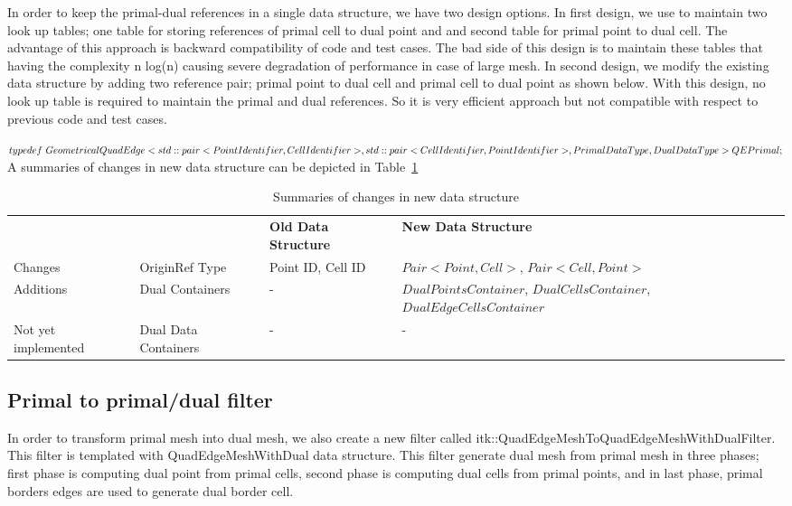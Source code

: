 \documentclass{InsightArticle}
\begin{document}
In order to keep the primal-dual references in a single data structure, we have two design options. In first design, we use to maintain two look up tables; one table for storing references of primal cell to dual point and and second table for primal point to dual cell. The advantage of this approach is backward compatibility of code and test cases. The bad side of this design is to maintain these tables that having the complexity n log(n) causing severe degradation of performance in case of large mesh. In second design, we modify the existing data structure by adding two reference pair; primal point to dual cell and primal cell to dual point as shown below. With this design, no look up table is required to maintain the primal and dual references. So it is very efficient approach but not compatible with respect to previous code and test cases. 

$typedef \ GeometricalQuadEdge< \\
    std::pair<PointIdentifier, CellIdentifier>, \\
    std::pair<CellIdentifier,  PointIdentifier>, \\
    PrimalDataType, DualDataType \\
    > QEPrimal;$
A summaries of changes in new data structure can be depicted in Table~\ref{table:secondDesign}
\begin{table}
	\begin{center}
		\caption{Summaries of changes in new data structure}
		\label{table:secondDesign}
		\begin{tabular}{ p{3.5cm} p{3.5cm} p{2cm} p{3.7cm} }
			\hline	
			\noalign{\smallskip} 
			{\bf  }	& {\bf } 	& {\bf Old Data Structure}	& {\bf New Data Structure}\\
			\noalign{\smallskip}	
			\hline  	
			\noalign{\smallskip}
			Changes & OriginRef Type & Point ID, Cell ID & $Pair<Point, Cell>$, $Pair<Cell, Point>$\\ 
			Additions & Dual Containers & - & $DualPointsContainer$, $DualCellsContainer$, $DualEdgeCellsContainer$\\
			Not yet implemented & Dual Data Containers & - & -\\
			\hline
	\end{tabular}
	\end{center}
\end{table}
\subsection{Primal to primal/dual filter }
In order to transform primal mesh into dual mesh, we also create a new filter called itk::QuadEdgeMeshToQuadEdgeMeshWithDualFilter. This filter is templated with QuadEdgeMeshWithDual data structure. This filter generate dual mesh from primal mesh in three phases; first phase is computing dual point from primal cells, second phase is computing dual cells from primal points, and in last phase, primal borders edges are used to generate dual border cell.
\end{document}
